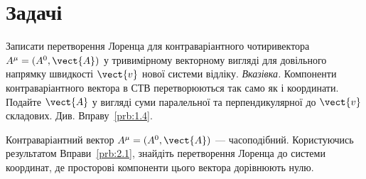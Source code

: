 \section*{Задачі}


\begin{problem}\label{prb:2.1}%
  Записати перетворення Лоренца для контраваріантного чотиривектора $A^\mu = (A^0, \vect{A})$ у тривимірному векторному
  вигляді для довільного напрямку швидкості $\vect{v}$ нової системи відліку. \textit{Вказівка.} Компоненти
  контраваріантного вектора в СТВ перетворюються так само як і координати. Подайте $\vect{A}$ у вигляді суми паралельної
  та перпендикулярної до $\vect{v}$ складових. Див. Вправу~\ref{prb:1.4}.
\end{problem}

\begin{problem}%
  Контраваріантний вектор $A^\mu = (A^0, \vect{A})$ --- часоподібний. Користуючись результатом Вправи~\ref{prb:2.1},
  знайдіть перетворення Лоренца до системи координат, де просторові компоненти цього вектора дорівнюють нулю.
\end{problem}